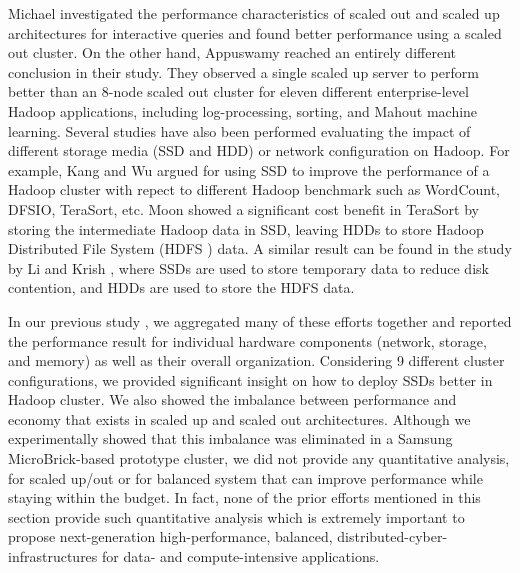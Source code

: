 \documentclass[journal]{IEEEtran}
\begin{document}
Michael \cite{scaleupscaleout:michael} investigated the performance characteristics of scaled out and scaled up architectures for interactive queries and found better performance using a scaled out cluster. On the other hand, Appuswamy \cite{scaleupscaleout:appuswamy} reached an entirely different conclusion in their study. They observed a single scaled up server to perform better than an 8-node scaled out cluster for eleven different enterprise-level Hadoop applications, including log-processing, sorting, and Mahout machine learning. Several studies have also been performed evaluating the impact of different storage media (SSD and HDD) or network configuration on Hadoop. For example, Kang \cite{ssdhdd:kang}  and Wu \cite{ssdhdd:wu} argued for using SSD  to improve the performance of a Hadoop cluster with repect to different Hadoop benchmark such as WordCount, DFSIO, TeraSort, etc. Moon \cite{ssdhdd:moon} showed a significant cost benefit in TeraSort by storing the intermediate Hadoop data in SSD, leaving HDDs to store Hadoop Distributed File System (HDFS \cite{fw:hdfs}) data. A similar result can be found in the study by Li \cite{ssdhdd:li} and Krish \cite{ssdhdd:krish}, where SSDs are used to store temporary data to reduce disk contention, and HDDs are used to store the HDFS data. 

In our previous study \cite{scaleupscaleout:das2015evaluating}, we aggregated many of these efforts together and reported the performance result for individual hardware components (network, storage, and memory) as well as their overall organization. Considering 9 different cluster configurations, we provided significant insight on  how to deploy SSDs better in Hadoop cluster. We also showed the imbalance between performance and economy that exists in scaled up and scaled out architectures. Although we experimentally showed that this imbalance was eliminated in a Samsung MicroBrick-based prototype cluster, we did not provide any quantitative analysis, for scaled up/out or for balanced system that can improve performance while staying within the budget. In fact, none of the prior efforts mentioned in this section provide such quantitative analysis which is extremely important to propose next-generation high-performance, balanced, distributed-cyber-infrastructures for data- and compute-intensive applications.
\end{document}
